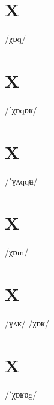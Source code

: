 \documentclass[10pt,a4paper,twoside]{book}
\begin{document}
\section*{X}

\begin{multicols}{3}
 {/χɒq/} {}
\end{multicols}

\section*{X}

\begin{multicols}{3}
 {/ˈχɒqɒʁ/} {}
\end{multicols}

\section*{X}

\begin{multicols}{3}
 {/ˈɣʌqqʉ/} {}
\end{multicols}

\section*{X}

\begin{multicols}{3}
 {/χɒm/} {}
\end{multicols}

\section*{X}

\begin{multicols}{3}
 {/ɣʌʁ/} {}
 {/χɒʁ/} {}
\end{multicols}

\section*{X}

\begin{multicols}{3}
 {/ˈχɒʁɒg/} {}
\end{multicols}
\end{document}
